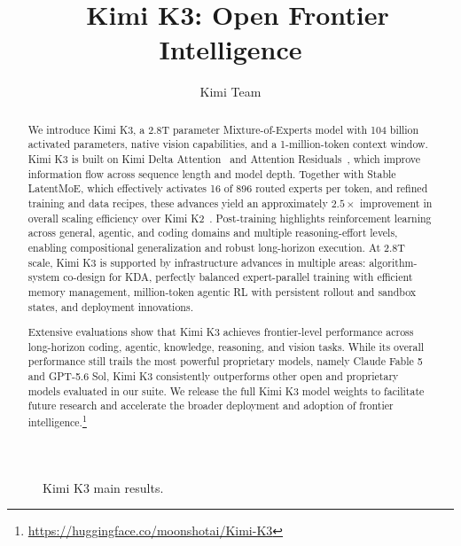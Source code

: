 \documentclass{article}
\title{
\kimilogo \ Kimi K3: Open Frontier Intelligence}
\author{Kimi Team}
\date{}
\newcommand{\citep}[1]{\parencite{#1}}
\newcommand{\kimi}[1]{Kimi K#1}
\begin{document}
\maketitle

\vspace{-17pt}
\begin{abstract}
We introduce \kimi{3}, a 2.8T parameter Mixture-of-Experts model with 104 billion activated parameters, native vision capabilities, and a 1-million-token context window. 
\kimi{3} is built on Kimi Delta Attention~\citep{team2025kimi} and Attention Residuals~\citep{kimiteam2026attnres}, which improve information flow across sequence length and model depth. 
Together with Stable LatentMoE, which effectively activates 16 of 896 routed experts per token, and refined training and data recipes, these advances yield an approximately $2.5\times$ improvement in overall scaling efficiency over \kimi{2}~\citep{kimiteam2025kimik2openagentic}.
Post-training highlights reinforcement learning across general, agentic, and coding domains and multiple reasoning-effort levels, enabling compositional generalization and robust long-horizon execution. 
At 2.8T scale, Kimi K3 is supported by infrastructure advances in multiple areas: algorithm-system co-design for KDA, perfectly balanced expert-parallel training with efficient memory management, million-token agentic RL with persistent rollout and sandbox states, and deployment innovations.

Extensive evaluations show that \kimi{3} achieves frontier-level performance across long-horizon coding, agentic, knowledge, reasoning, and vision tasks. 
While its overall performance still trails the most powerful proprietary models, namely Claude Fable 5 and GPT-5.6 Sol, \kimi{3} consistently outperforms other open and proprietary models evaluated in our suite. 
We release the full \kimi{3} model weights to facilitate future research and accelerate the broader deployment and adoption of frontier intelligence.\footnote{\url{https://huggingface.co/moonshotai/Kimi-K3}}
\end{abstract}

\begin{figure}[htb]
    \centering
    \resizebox{0.95\textwidth}{!}{}
    \caption{\kimi{3} main results.\protect}
    \label{fig:kimi-k3-results}
\end{figure}













\clearpage
\printbibliography[title={References}]

\clearpage
\appendix

\end{document}
